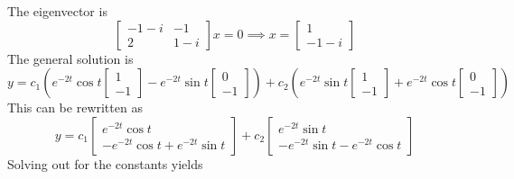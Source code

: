 The eigenvector is
\[
    \begin{bmatrix}
        -1 - i & -1 \\
        2 & 1-i
    \end{bmatrix} x = 0
    \implies x = 
    \begin{bmatrix}
        1 \\ -1-i
    \end{bmatrix}
\]
The general solution is 
\[
    y = c_1\left(e^{-2t}\cos t \begin{bmatrix} 1 \\ -1 \end{bmatrix} 
          - e^{-2t}\sin t \begin{bmatrix} 0 \\ -1 \end{bmatrix}\right) +
        c_2\left(e^{-2t}\sin t \begin{bmatrix} 1 \\ -1 \end{bmatrix} 
          + e^{-2t}\cos t \begin{bmatrix} 0 \\ -1 \end{bmatrix}\right) 
\]
This can be rewritten as 
\[
    y = c_1
    \begin{bmatrix}
        e^{-2t}\cos t \\
        -e^{-2t}\cos t + e^{-2t}\sin t
    \end{bmatrix} + 
    c_2
    \begin{bmatrix}
        e^{-2t}\sin t \\
        -e^{-2t}\sin t - e^{-2t}\cos t
    \end{bmatrix}
\]
Solving out for the constants yields 
